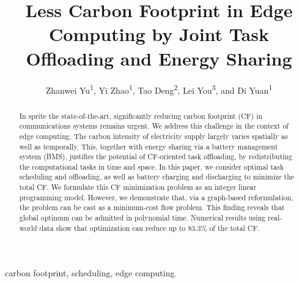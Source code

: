 \documentclass[conference, 10pt, ﬁnal, letterpaper, twocolumn]{IEEEtran}
\begin{document}
\title{Less Carbon Footprint in Edge Computing by Joint Task Offloading and Energy Sharing}

 
\author{Zhanwei Yu\textsuperscript{1}, Yi Zhao\textsuperscript{1}, Tao Deng\textsuperscript{2}, Lei You\textsuperscript{3}, and Di Yuan\textsuperscript{1}}


\renewcommand*{\Affilfont}{\small}

\maketitle

\begin{abstract}
In sprite the state-of-the-art, significantly reducing carbon footprint (CF) in communications systems remains urgent. We address this challenge in the context of edge computing. The carbon intensity of electricity supply largely varies spatially as well as temporally. This, together with energy sharing via a battery management system (BMS), justifies the potential of CF-oriented task offloading, by redistributing the computational tasks in time and space. In this paper, we consider optimal task scheduling and offloading, as well as battery charging and discharging to minimize the total CF. We formulate this CF minimization problem as an integer linear programming model. However, we demonstrate that, via a graph-based reformulation, the problem can be cast as a minimum-cost flow problem. This finding reveals that global optimum can be admitted in polynomial time. Numerical results using real-world data show that optimization can reduce up to $83.3\%$ of the total CF.
\end{abstract}

\begin{IEEEkeywords}
carbon footprint, scheduling, edge computing.
\end{IEEEkeywords}
\end{document}

